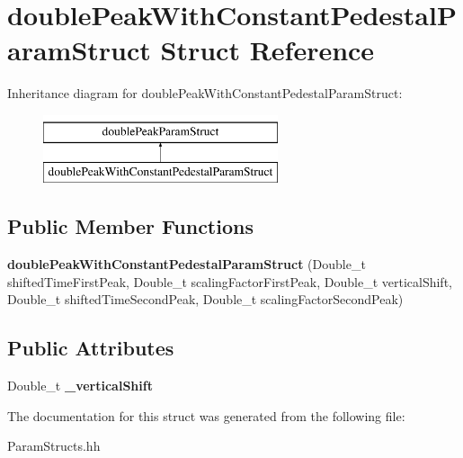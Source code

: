 \hypertarget{structdouble_peak_with_constant_pedestal_param_struct}{}\section{double\+Peak\+With\+Constant\+Pedestal\+Param\+Struct Struct Reference}
\label{structdouble_peak_with_constant_pedestal_param_struct}
Inheritance diagram for double\+Peak\+With\+Constant\+Pedestal\+Param\+Struct\+:\begin{figure}[H]
\begin{center}
\leavevmode
\includegraphics[height=2.000000cm]{structdouble_peak_with_constant_pedestal_param_struct}
\end{center}
\end{figure}
\subsection*{Public Member Functions}
\begin{DoxyCompactItemize}
\item 
\hypertarget{structdouble_peak_with_constant_pedestal_param_struct_ab7a85f3cee2363af395a7c295ecd648c}{}{\bfseries double\+Peak\+With\+Constant\+Pedestal\+Param\+Struct} (Double\+\_\+t shifted\+Time\+First\+Peak, Double\+\_\+t scaling\+Factor\+First\+Peak, Double\+\_\+t vertical\+Shift, Double\+\_\+t shifted\+Time\+Second\+Peak, Double\+\_\+t scaling\+Factor\+Second\+Peak)\label{structdouble_peak_with_constant_pedestal_param_struct_ab7a85f3cee2363af395a7c295ecd648c}

\end{DoxyCompactItemize}
\subsection*{Public Attributes}
\begin{DoxyCompactItemize}
\item 
\hypertarget{structdouble_peak_with_constant_pedestal_param_struct_a8d42a7e7318a458ec1639988051153b3}{}Double\+\_\+t {\bfseries \+\_\+vertical\+Shift}\label{structdouble_peak_with_constant_pedestal_param_struct_a8d42a7e7318a458ec1639988051153b3}

\end{DoxyCompactItemize}


The documentation for this struct was generated from the following file\+:\begin{DoxyCompactItemize}
\item 
Param\+Structs.\+hh\end{DoxyCompactItemize}
